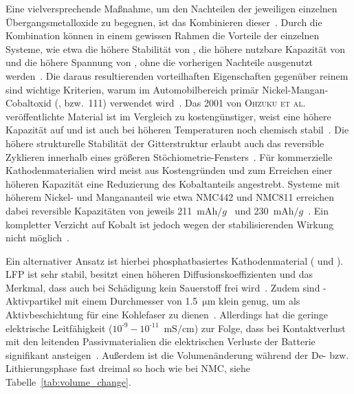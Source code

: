 Eine vielversprechende Maßnahme, um den Nachteilen der jeweiligen einzelnen Übergangsmetalloxide zu begegnen, ist das Kombinieren dieser~\cite{Biasi2017}. Durch die Kombination können in einem gewissen Rahmen die Vorteile der einzelnen Systeme, wie etwa die höhere Stabilität von , die höhere nutzbare Kapazität von  und die höhere Spannung von , ohne die vorherigen Nachteile ausgenutzt werden~\cite{Ren2023}.
Die daraus resultierenden vorteilhaften Eigenschaften gegenüber reinem  sind wichtige Kriterien, warum im Automobilbereich primär Nickel-Mangan-Cobaltoxid (,  bzw.\ 111) verwendet wird~\cite{Burow2016}. Das 2001 von \textsc{Ohzuku et al.}~\cite{Ohzuku2001, Yabuuchi2003} veröffentlichte Material ist im Vergleich zu  kostengünstiger, weist eine höhere Kapazität auf und ist auch bei höheren Temperaturen noch chemisch stabil~\cite{Kim2016,Zheng2012}. 
Die höhere strukturelle Stabilität der Gitterstruktur erlaubt auch das reversible Zyklieren innerhalb eines größeren Stöchiometrie-Fensters~\cite{Dolotko2014,Choi2005}. 
Für kommerzielle Kathodenmaterialien wird meist aus Kostengründen und zum Erreichen einer höheren Kapazität eine Reduzierung des Kobaltanteils angestrebt. Systeme mit höherem Nickel- und Mangananteil wie etwa NMC442 und NMC811 erreichen dabei reversible Kapazitäten von jeweils 211~$\si{\milli \ampere \hour \per g}$~\cite{Ma2014} und 230~$\si{\milli \ampere \hour \per g}$~\cite{Xue2021}. Ein kompletter Verzicht auf Kobalt ist jedoch wegen der stabilisierenden Wirkung nicht möglich~\cite{Ren2023}.

Ein alternativer Ansatz ist hierbei phosphatbasiertes Kathodenmaterial ( und ). LFP ist sehr stabil, besitzt einen höheren Diffusionskoeffizienten und das Merkmal, dass auch bei Schädigung kein Sauerstoff frei wird~\cite{Ling2021}. Zudem sind -Aktivpartikel mit einem Durchmesser von 1.5~$\si{\um}$ klein genug, um als Aktivbeschichtung für eine Kohlefaser zu dienen~\cite{Yuecel2023}.
Allerdings hat die geringe elektrische Leitfähigkeit ($10^{\text{-}9}-10^{\text{-}11}$~$\si{\milli \siemens \per \cm}$) zur Folge, dass bei Kontaktverlust mit den leitenden Passivmaterialien die elektrischen Verluste der Batterie signifikant ansteigen~\cite{Padhi1997}. Außerdem ist die Volumenänderung während der De- bzw. Lithierungsphase fast dreimal so hoch wie bei NMC, siehe Tabelle~\ref{tab:volume_change}.

